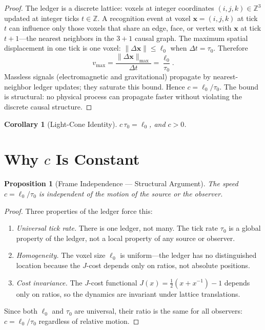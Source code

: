 \documentclass[12pt,a4paper]{article}
\newtheorem{corollary}[theorem]{Corollary}
\newtheorem{proposition}[theorem]{Proposition}
\theoremstyle{definition}
\theoremstyle{remark}
\begin{document}
\begin{proof}
The ledger is a discrete lattice: voxels at integer coordinates
$(i,j,k) \in \mathbb{Z}^3$ updated at integer ticks $t \in
\mathbb{Z}$.  A recognition event at voxel $\mathbf{x} = (i,j,k)$ at
tick $t$ can influence only those voxels that share an edge, face, or
vertex with $\mathbf{x}$ at tick $t+1$---the nearest neighbors in the
$3+1$ causal graph.  The maximum spatial displacement in one tick is
one voxel: $\|\Delta\mathbf{x}\| \leq \ell_0$ when $\Delta t =
\tau_0$.  Therefore
\begin{equation}
  v_{\max} = \frac{\|\Delta\mathbf{x}\|_{\max}}{\Delta t}
  = \frac{\ell_0}{\tau_0}.
\end{equation}
Massless signals (electromagnetic and gravitational) propagate by
nearest-neighbor ledger updates; they saturate this bound.  Hence
$c = \ell_0/\tau_0$.  The bound is structural: no physical process
can propagate faster without violating the discrete causal structure.
\end{proof}

\begin{corollary}[Light-Cone Identity]
$c\,\tau_0 = \ell_0$, and $c > 0$.
\end{corollary}

\section{Why $c$ Is Constant}
\label{sec:constant}

\begin{proposition}[Frame Independence --- Structural Argument]
\label{thm:constant}
The speed $c = \ell_0/\tau_0$ is independent of the motion of
the source or the observer.
\end{proposition}

\begin{proof}
Three properties of the ledger force this:
\begin{enumerate}[label=(\roman*),nosep]
  \item \emph{Universal tick rate.}  There is one ledger, not
  many.  The tick rate $\tau_0$ is a global property of the
  ledger, not a local property of any source or observer.
  \item \emph{Homogeneity.}  The voxel size $\ell_0$ is
  uniform---the ledger has no distinguished location because the
  $J$-cost depends only on ratios, not absolute positions.
  \item \emph{Cost invariance.}  The $J$-cost functional
  $J(x) = \frac{1}{2}(x+x^{-1})-1$ depends only on ratios,
  so the dynamics are invariant under lattice translations.
\end{enumerate}
Since both $\ell_0$ and $\tau_0$ are universal, their ratio is
the same for all observers:
$c = \ell_0/\tau_0$ regardless of relative motion.
\end{proof}
\end{document}
